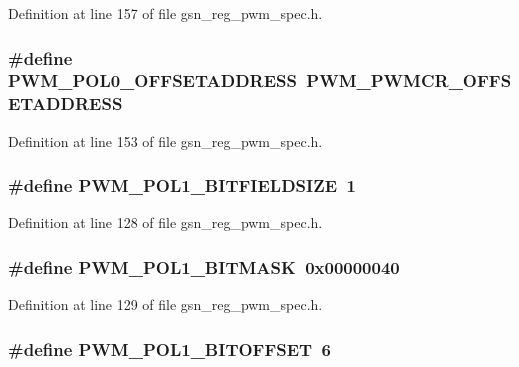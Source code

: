 Definition at line 157 of file gsn\_\-reg\_\-pwm\_\-spec.h.

\hypertarget{a00565_a294ebda7eef2c91c8f52559b8789b736}{
\subsubsection[{PWM\_\-POL0\_\-OFFSETADDRESS}]{\setlength{\rightskip}{0pt plus 5cm}\#define PWM\_\-POL0\_\-OFFSETADDRESS~PWM\_\-PWMCR\_\-OFFSETADDRESS}}
\label{a00565_a294ebda7eef2c91c8f52559b8789b736}


Definition at line 153 of file gsn\_\-reg\_\-pwm\_\-spec.h.

\hypertarget{a00565_aa2a8b0096107ef70cec17fde6fd14087}{
\subsubsection[{PWM\_\-POL1\_\-BITFIELDSIZE}]{\setlength{\rightskip}{0pt plus 5cm}\#define PWM\_\-POL1\_\-BITFIELDSIZE~1}}
\label{a00565_aa2a8b0096107ef70cec17fde6fd14087}


Definition at line 128 of file gsn\_\-reg\_\-pwm\_\-spec.h.

\hypertarget{a00565_aa52c1424968758179b9f047aa946058d}{
\subsubsection[{PWM\_\-POL1\_\-BITMASK}]{\setlength{\rightskip}{0pt plus 5cm}\#define PWM\_\-POL1\_\-BITMASK~0x00000040}}
\label{a00565_aa52c1424968758179b9f047aa946058d}


Definition at line 129 of file gsn\_\-reg\_\-pwm\_\-spec.h.

\hypertarget{a00565_a549bceaced16a3cbb3e435ec9e3bafab}{
\subsubsection[{PWM\_\-POL1\_\-BITOFFSET}]{\setlength{\rightskip}{0pt plus 5cm}\#define PWM\_\-POL1\_\-BITOFFSET~6}}
\label{a00565_a549bceaced16a3cbb3e435ec9e3bafab}



